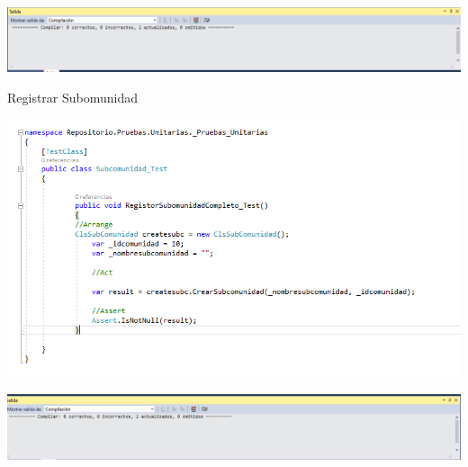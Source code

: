 \begin{center}
\includegraphics[width=18cm]{./Imagenes/prueba22}
\end{center}

\item 
Registrar Subomunidad

\begin{center}
\includegraphics[width=18cm]{./Imagenes/prueba3}
\end{center}


\begin{center}
\includegraphics[width=18cm]{./Imagenes/prueba33}
\end{center}

